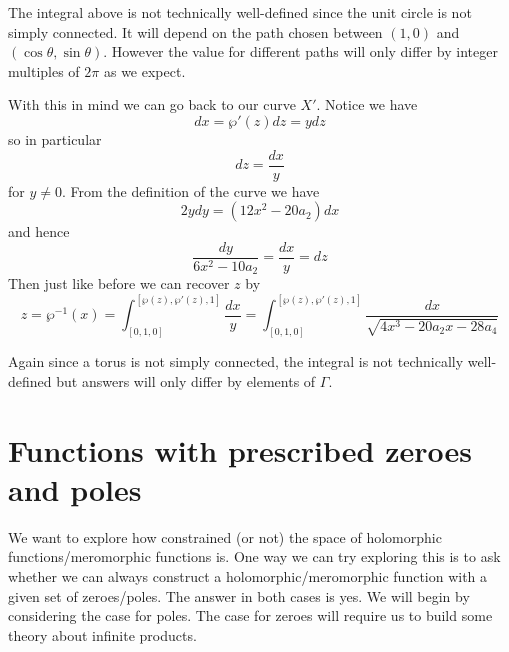 \begin{remark}
    The integral above is not technically well-defined since the unit circle is not simply connected. It will depend on the path chosen between $(1, 0)$ and $(\cos \theta, \sin \theta)$. However the value for different paths will only differ by integer multiples of $2\pi$ as we expect. 
\end{remark}

With this in mind we can go back to our curve $X'$. Notice we have
$$dx = \wp'(z)dz = ydz$$
so in particular
$$dz = \frac{dx}{y}$$
for $y \neq 0$. From the definition of the curve we have
$$2ydy = (12x^2 - 20a_2)dx$$
and hence
$$\frac{dy}{6x^2 - 10a_2} = \frac{dx}{y} = dz$$
Then just like before we can recover $z$ by 
$$z = \wp^{-1}(x) = \int_{[0, 1, 0]}^{[\wp(z), \wp'(z), 1]} \frac{dx}{y} = \int_{[0, 1, 0]}^{[\wp(z), \wp'(z), 1]} \frac{dx}{\sqrt{4x^3 - 20a_2x - 28a_4}}$$

Again since a torus is not simply connected, the integral is not technically well-defined but answers will only differ by elements of $\Gamma$. 

\section{Functions with prescribed zeroes and poles}
We want to explore how constrained (or not) the space of holomorphic functions/meromorphic functions is. One way we can try exploring this is to ask whether we can always construct a holomorphic/meromorphic function with a given set of zeroes/poles. The answer in both cases is yes. We will begin by considering the case for poles. The case for zeroes will require us to build some theory about infinite products.

